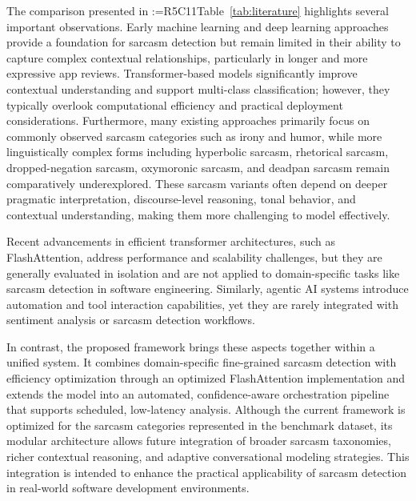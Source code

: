 \documentclass[a4paper,fleqn]{cas-sc}
\makeatletter
\newif\iftracked
\newcommand{\rv@setcolour}[1]{%
  \IfStrEq{#1}{R7C7}{\color{rvEdit}}{%
    \IfSubStr{#1}{R5}{\IfSubStr{#1}{R7}{\color{rvBoth}}{\color{rvFive}}}{\color{rvSeven}}}}
\newcommand{\rv@tag}[1]{\textsuperscript{\sffamily\bfseries\scriptsize[\StrSubstitute{#1}{,}{, }]}\,}
\newcommand{\rv@recordone}[1]{%
  \edef\rv@i{#1}%
  \ifcsdef{rv@n@\rv@i}{}{\csgdef{rv@n@\rv@i}{0}}%
  \csxdef{rv@n@\rv@i}{\the\numexpr\csuse{rv@n@\rv@i}+1\relax}%
  \begingroup\edef\@currentlabel{\rv@i}\label{rv:\rv@i:\csuse{rv@n@\rv@i}}\endgroup}
\newcommand{\rv@record}[1]{\@for\rv@id:=#1\do{\expandafter\rv@recordone\expandafter{\rv@id}}}
\DeclareRobustCommand{\rcrep}[3]{\rv@record{#1}\iftracked{\rv@setcolour{#1}\rv@tag{#1}\rv@strike{#2} #3}\else#3\fi}
\makeatother
\begin{document}
The comparison presented in \rcrep{R5C11}{(Table 13)}{Table~\ref{tab:literature}} highlights several important observations. Early machine learning and deep learning approaches provide a foundation for sarcasm detection but remain limited in their ability to capture complex contextual relationships, particularly in longer and more expressive app reviews. Transformer-based models significantly improve contextual understanding and support multi-class classification; however, they typically overlook computational efficiency and practical deployment considerations. Furthermore, many existing approaches primarily focus on commonly observed sarcasm categories such as irony and humor, while more linguistically complex forms including hyperbolic sarcasm, rhetorical sarcasm, dropped-negation sarcasm, oxymoronic sarcasm, and deadpan sarcasm remain comparatively underexplored. These sarcasm variants often depend on deeper pragmatic interpretation, discourse-level reasoning, tonal behavior, and contextual understanding, making them more challenging to model effectively.

Recent advancements in efficient transformer architectures, such as FlashAttention, address performance and scalability challenges, but they are generally evaluated in isolation and are not applied to domain-specific tasks like sarcasm detection in software engineering. Similarly, agentic AI systems introduce automation and tool interaction capabilities, yet they are rarely integrated with sentiment analysis or sarcasm detection workflows.

In contrast, the proposed framework brings these aspects together within a unified system. It combines domain-specific fine-grained sarcasm detection with efficiency optimization through an optimized FlashAttention implementation and extends the model into an automated, confidence-aware orchestration pipeline that supports scheduled, low-latency analysis. Although the current framework is optimized for the sarcasm categories represented in the benchmark dataset, its modular architecture allows future integration of broader sarcasm taxonomies, richer contextual reasoning, and adaptive conversational modeling strategies. This integration is intended to enhance the practical applicability of sarcasm detection in real-world software development environments.
\end{document}
